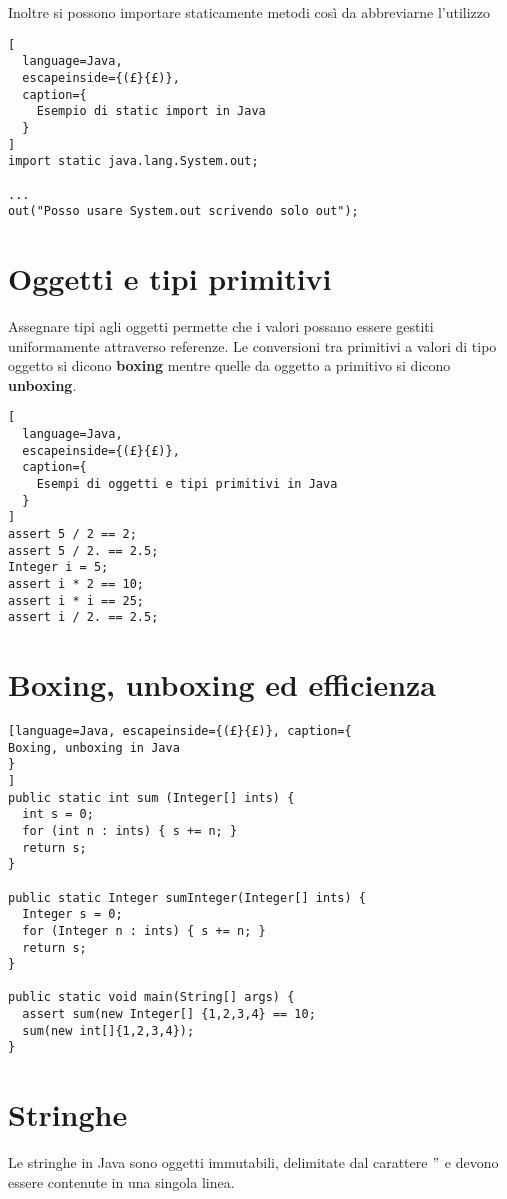 Inoltre si possono importare staticamente metodi così da abbreviarne l'utilizzo
\begin{lstlisting}[
  language=Java,
  escapeinside={(£}{£)},
  caption={
    Esempio di static import in Java
  }
]
import static java.lang.System.out;

...
out("Posso usare System.out scrivendo solo out");
\end{lstlisting}

\section{Oggetti e tipi primitivi}
Assegnare tipi agli oggetti permette che i valori possano essere gestiti
uniformamente attraverso referenze.
Le conversioni tra primitivi a valori di tipo oggetto si dicono \textbf{boxing}
mentre quelle da oggetto a primitivo si dicono \textbf{unboxing}.

\begin{lstlisting}[
  language=Java,
  escapeinside={(£}{£)},
  caption={
    Esempi di oggetti e tipi primitivi in Java
  }
]
assert 5 / 2 == 2;
assert 5 / 2. == 2.5;
Integer i = 5;
assert i * 2 == 10;
assert i * i == 25;
assert i / 2. == 2.5;
\end{lstlisting}

\section{Boxing, unboxing ed efficienza}
\begin{lstlisting}[language=Java, escapeinside={(£}{£)}, caption={
Boxing, unboxing in Java
}
]
public static int sum (Integer[] ints) {
  int s = 0;
  for (int n : ints) { s += n; }
  return s;
}

public static Integer sumInteger(Integer[] ints) {
  Integer s = 0;
  for (Integer n : ints) { s += n; }
  return s;
}

public static void main(String[] args) {
  assert sum(new Integer[] {1,2,3,4} == 10;
  sum(new int[]{1,2,3,4});
}
\end{lstlisting}

\section{Stringhe}
Le stringhe in Java sono oggetti immutabili, delimitate dal carattere $"$ e
devono essere contenute in una singola linea.

